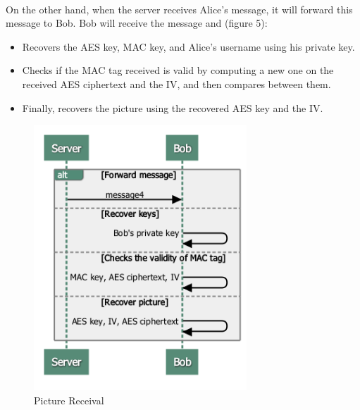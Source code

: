 	    \paragraph{}
	      On the other hand, when the server receives Alice's message, it will forward this message to Bob. Bob will receive the message and (figure 5):
	      \begin{itemize}
	       \item Recovers the AES key, MAC key, and Alice's username using his private key.
	       \item Checks if the MAC tag received is valid by computing a new one on the received AES ciphertext and the IV, and then compares between them.
	       \item Finally, recovers the picture using the recovered AES key and the IV.
	      \end{itemize}

	    \begin{figure}[H]
	    
	      \centering
	      \includegraphics[width=8cm]{images/architecture/receive}
	      \caption{Picture Receival}
	     
	    \end{figure}

	    
	    
	    




	  
      
      
     
      


	
  